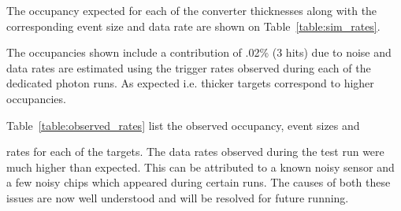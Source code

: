 The occupancy expected for each of the converter thicknesses along with the 
corresponding event size and data rate are shown on Table~\ref{table:sim_rates}.
\begin{table}[h]
    \caption{Occupancy, event size and resulting data rate expected for each of the three 
             converter thicknesses used in the test run.}
    \label{table:sim_rates}
\end{table}
The occupancies shown include a contribution of .02\% (3 hits) due to noise and  
data rates are estimated using the trigger rates observed during each
of the dedicated photon runs. As expected i.e. thicker targets correspond to higher 
occupancies. 

Table~\ref{table:observed_rates} list the observed occupancy, event sizes and 
\begin{table}[h]
    \caption{Occupancy, event size and resulting data rate observed for each of the three 
             converter thicknesses used in the test run.}
    \label{table:observed_rates}
\end{table}    
rates for each of the targets.  The data rates observed during the test run were
much higher than expected.  This can be attributed to a known
noisy sensor and a few noisy chips which appeared during certain runs.  The causes
of both these issues are now well understood and will be resolved for future running.


